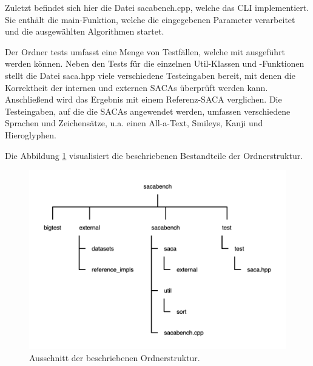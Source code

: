 Zuletzt befindet sich hier die Datei sacabench.cpp, welche das CLI implementiert. 
Sie enthält die main-Funktion, welche die eingegebenen Parameter verarbeitet und die ausgewählten Algorithmen startet.\par
Der Ordner tests umfasst eine Menge von Testfällen, welche mit  ausgeführt werden können. 
Neben den Tests für die einzelnen Util-Klassen und -Funktionen stellt die Datei saca.hpp viele verschiedene Testeingaben bereit, mit denen die Korrektheit der internen und externen SACAs überprüft werden kann. 
Anschließend wird das Ergebnis mit einem Referenz-SACA verglichen. 
Die Testeingaben, auf die die SACAs angewendet werden, umfassen verschiedene Sprachen und Zeichensätze, u.a. einen All-a-Text, Smileys, Kanji und Hieroglyphen.\par
Die Abbildung \ref{ordner_struktur} visualisiert die beschriebenen Bestandteile der Ordnerstruktur.

\begin{figure}[t!]
\centering
\includegraphics[width=\textwidth]{kapitel/3_framework/code_structure/ordner_struktur}
\caption[Ausschnitt der beschriebenen Ordnerstruktur.]{Ausschnitt der beschriebenen Ordnerstruktur.}
\label{ordner_struktur}
\end{figure}
